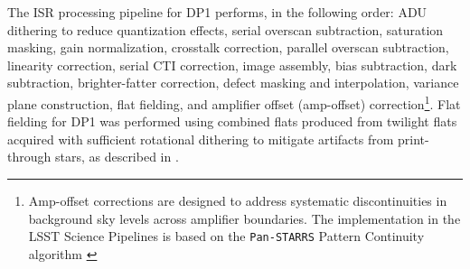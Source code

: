 The \gls{ISR} processing pipeline for \gls{DP1} performs, in the following order: \gls{ADU} dithering to reduce quantization effects, serial overscan subtraction, saturation masking, gain normalization, crosstalk correction, parallel overscan subtraction, linearity correction, serial \gls{CTI} correction, image assembly, bias subtraction, dark subtraction, brighter-fatter correction, defect masking and interpolation, variance plane construction, flat fielding, and amplifier offset (amp-offset) correction\footnote{Amp-offset corrections are designed to address systematic discontinuities in background sky levels across amplifier boundaries. The implementation in the LSST Science Pipelines is based on the \texttt{Pan-STARRS} Pattern Continuity algorithm \citep{2020ApJS..251....4W}}.
Flat fielding for \gls{DP1} was performed using combined flats produced from twilight flats acquired with sufficient rotational dithering to mitigate artifacts from print-through stars, as described in .



